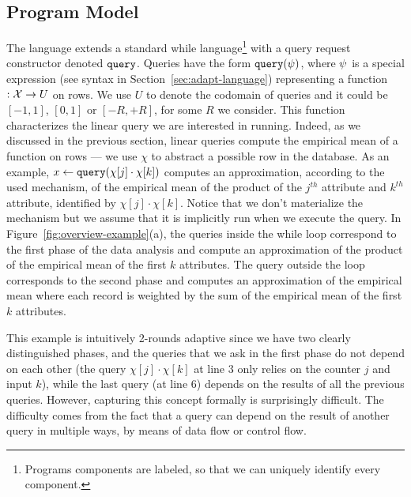 \subsection{Program Model}
The {\THESYSTEM} language extends a standard while language\footnote{Programs components are labeled, so that we can uniquely identify every component.} with a query request constructor denoted ${\tt query}$. Queries have the form ${\tt query}(\psi)$, where $\psi$ is a special expression 
(see syntax in Section~\ref{sec:adapt-language}) representing a function $: \mathcal{X} \to U$ on rows.
We use $U$ to denote the codomain of queries and it could be $[-1,1]$, $[0,1]$ or $[-R,+R]$, for some $R$ we consider. This function characterizes the linear query we are interested in running. Indeed, as we discussed in the previous section, linear queries compute the empirical mean of a function on rows --- we use $\chi$ to abstract a possible row in the database.
 As an example, $x \leftarrow {\tt query}(\chi[j] \cdot \chi[k])$ computes an approximation, according to the used mechanism, of the empirical mean of the product of the $j^{th}$ attribute and $k^{th}$ attribute, identified by $\chi[j] \cdot \chi[k]$. Notice that we don't materialize the mechanism but we assume that it is implicitly run when we execute the query. 
 In Figure~\ref{fig:overview-example}(a), the queries inside the while loop correspond to the first phase of the data analysis and compute an approximation of 
the product of the empirical mean of the first $k$ attributes. 
The query outside the loop corresponds to the second phase and computes an approximation of the empirical mean where each record is weighted by the sum of the empirical mean of the first $k$ attributes.


This example is intuitively 2-rounds adaptive since we have two clearly distinguished phases, and the queries that we ask in the first phase do not depend on each other (the query $\chi[j] \cdot \chi[k]$ at line $3$ only relies on the counter $j$ and input $k$), while the last query 
(at line 6) depends on the results of all the previous queries. 
However, capturing this concept formally is surprisingly difficult. The difficulty comes from the fact that a query can depend on the result of another query in multiple ways, by means of data flow or control flow.


